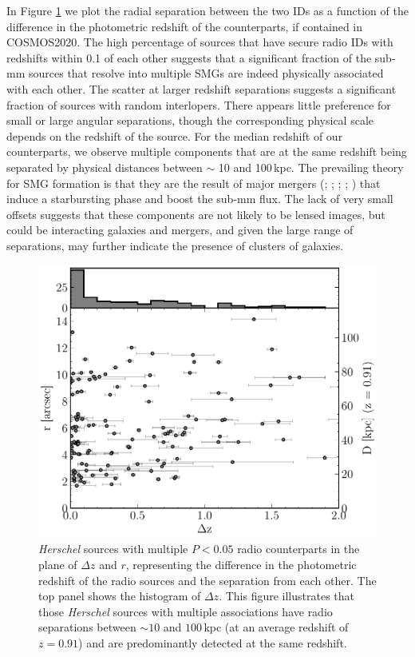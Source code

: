 In Figure \ref{fig:multiples_separation} we plot the radial separation between the two IDs as a function of the difference in the photometric redshift of the counterparts, if contained in COSMOS2020. The high percentage of sources that have secure radio IDs with redshifts within 0.1 of each other suggests that a significant fraction of the sub-mm sources that resolve into multiple SMGs are indeed physically associated with each other. The scatter at larger redshift separations suggests a significant fraction of sources with random interlopers. There appears little preference for small or large angular separations, though the corresponding physical scale depends on the redshift of the source. For the median redshift of our counterparts, we observe multiple components that are at the same redshift being separated by physical distances between $\sim$ 10 and 100\,kpc. The prevailing theory for SMG formation is that they are the result of major mergers (\citealt{Ivison_2002}; \citealt{Smail_2004}; \citealt{Ivison_2007}; \citealt{Engel_2010}; \citealt{Hayward_2011}) that induce a starbursting phase and boost the sub-mm flux. The lack of very small offsets suggests that these components are not likely to be lensed images, but could be interacting galaxies and mergers, and given the large range of separations, may further indicate the presence of clusters of galaxies.

\begin{figure}
	\centering
	\includegraphics[width=0.75\columnwidth]{Figures/multiples_separation.pdf}
	\caption{\textit{Herschel} sources with multiple $P < 0.05$ radio counterparts in the plane of $\Delta z$ and $r$, representing the difference in the photometric redshift of the radio sources and the separation from each other. The top panel shows the histogram of $\Delta z$. This figure illustrates that those \textit{Herschel} sources with multiple associations have radio separations between $\sim 10$ and $100\,$kpc (at an average redshift of $z = 0.91$) and are predominantly detected at the same redshift.}
	\label{fig:multiples_separation}
\end{figure}

